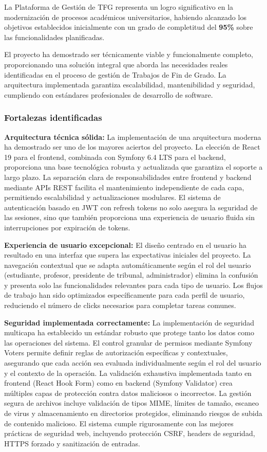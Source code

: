 \documentclass[12pt,a4paper,oneside]{report}
\begin{document}
La Plataforma de Gestión de TFG representa un logro significativo en la
modernización de procesos académicos universitarios, habiendo alcanzado
los objetivos establecidos inicialmente con un grado de completitud del
\textbf{95\%} sobre las funcionalidades planificadas.

El proyecto ha demostrado ser técnicamente viable y funcionalmente
completo, proporcionando una solución integral que aborda las
necesidades reales identificadas en el proceso de gestión de Trabajos de
Fin de Grado. La arquitectura implementada garantiza escalabilidad,
mantenibilidad y seguridad, cumpliendo con estándares profesionales de
desarrollo de software.

\subsubsection{Fortalezas identificadas}\label{fortalezas-identificadas}

\textbf{Arquitectura técnica sólida:} La implementación de una arquitectura moderna ha demostrado ser uno de los mayores aciertos del proyecto. La elección de React 19 para el frontend, combinada con Symfony 6.4 LTS para el backend, proporciona una base tecnológica robusta y actualizada que garantiza el soporte a largo plazo. La separación clara de responsabilidades entre frontend y backend mediante APIs REST facilita el mantenimiento independiente de cada capa, permitiendo escalabilidad y actualizaciones modulares. El sistema de autenticación basado en JWT con refresh tokens no solo asegura la seguridad de las sesiones, sino que también proporciona una experiencia de usuario fluida sin interrupciones por expiración de tokens.

\textbf{Experiencia de usuario excepcional:} El diseño centrado en el usuario ha resultado en una interfaz que supera las expectativas iniciales del proyecto. La navegación contextual que se adapta automáticamente según el rol del usuario (estudiante, profesor, presidente de tribunal, administrador) elimina la confusión y presenta solo las funcionalidades relevantes para cada tipo de usuario. Los flujos de trabajo han sido optimizados específicamente para cada perfil de usuario, reduciendo el número de clicks necesarios para completar tareas comunes.

\textbf{Seguridad implementada correctamente:} La implementación de seguridad multicapa ha establecido un estándar robusto que protege tanto los datos como las operaciones del sistema. El control granular de permisos mediante Symfony Voters permite definir reglas de autorización específicas y contextuales, asegurando que cada acción sea evaluada individualmente según el rol del usuario y el contexto de la operación. La validación exhaustiva implementada tanto en frontend (React Hook Form) como en backend (Symfony Validator) crea múltiples capas de protección contra datos maliciosos o incorrectos. La gestión segura de archivos incluye validación de tipos MIME, límites de tamaño, escaneo de virus y almacenamiento en directorios protegidos, eliminando riesgos de subida de contenido malicioso. El sistema cumple rigurosamente con las mejores prácticas de seguridad web, incluyendo protección CSRF, headers de seguridad, HTTPS forzado y sanitización de entradas.
\end{document}
